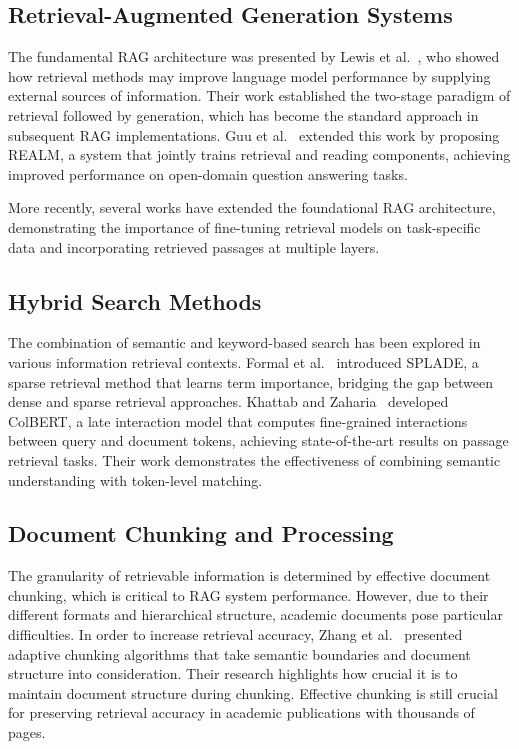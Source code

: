 \documentclass[runningheads]{llncs}
\begin{document}
\subsection{Retrieval-Augmented Generation Systems}
The fundamental RAG architecture was presented by Lewis et al.~\cite{lewis2020retrieval}, who showed how retrieval methods may improve language model performance by supplying external sources of information. Their work established the two-stage paradigm of retrieval followed by generation, which has become the standard approach in subsequent RAG implementations. Guu et al.~\cite{guu2020retrieval} extended this work by proposing REALM, a system that jointly trains retrieval and reading components, achieving improved performance on open-domain question answering tasks.

More recently, several works have extended the foundational RAG architecture, demonstrating the importance of fine-tuning retrieval models on task-specific data and incorporating retrieved passages at multiple layers.

\subsection{Hybrid Search Methods}

The combination of semantic and keyword-based search has been explored in various information retrieval contexts. Formal et al.~\cite{formal2021splade} introduced SPLADE, a sparse retrieval method that learns term importance, bridging the gap between dense and sparse retrieval approaches. Khattab and Zaharia~\cite{khattab2020colbert} developed ColBERT, a late interaction model that computes fine-grained interactions between query and document tokens, achieving state-of-the-art results on passage retrieval tasks. Their work demonstrates the effectiveness of combining semantic understanding with token-level matching.

\subsection{Document Chunking and Processing}

The granularity of retrievable information is determined by effective document chunking, which is critical to RAG system performance. However, due to their different formats and hierarchical structure, academic documents pose particular difficulties. In order to increase retrieval accuracy, Zhang et al.~\cite{zhang2023adaptive} presented adaptive chunking algorithms that take semantic boundaries and document structure into consideration. Their research highlights how crucial it is to maintain document structure during chunking. Effective chunking is still crucial for preserving retrieval accuracy in academic publications with thousands of pages.
\end{document}
